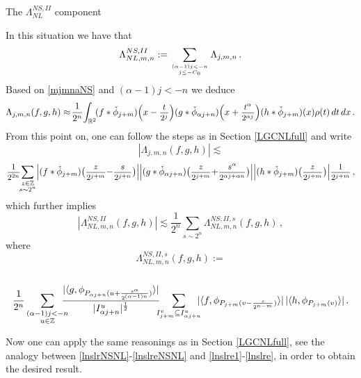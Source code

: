 \documentclass[a4paper,reqno]{amsart}
\makeatletter
\def\subsubsection{\@startsection{subsubsection}{3}%
	\z@{.5\linespacing\@plus.7\linespacing}{-.5em}%
	{\normalfont\bfseries\boldmath}}
\numberwithin{equation}{section}
\theoremstyle{definition}
\newcommand{\R}{\mathbb{R}}
\newcommand{\Z}{\mathbb{Z}}
\newcommand{\s}{\mathcal{S}}
\newcommand{\sdfrac}[2]{\mbox{\small$\displaystyle\frac{#1}{#2}$}}
\def\a{\alpha}
\def\L{\Lambda}
\makeatother
\begin{document}
\subsubsection{The $\L^{NS,II}_{NL}$ component}


In this situation we have that
\begin{align}\label{ns10NSNL}
\L^{NS,II}_{NL,m,n}:=\sum_{{(\a-1)j<-n}\atop{j\leq -C_0}} \L_{j,m,n}\,.
\end{align}
Based on \eqref{mjmnaNS} and $(\a-1)j<-n$ we deduce
\begin{equation}\label{saljm2nlNSNL}
\L_{j,m,n}(f,g,h)\approx\!\frac{1}{2^n}\!\int_{\R^2}\!  (f*\check{\phi}_{j+m})\Big(x-\sdfrac{t}{2^j}\Big)(g*\check{\phi}_{\a j+n})\Big(x+\sdfrac{t^{\a}}{2^{\a j}}\Big)(h*\check{\phi}_{j+m})(x)\rho(t)\,dt\,dx\,.
\end{equation}
From this point on, one can follow the steps as in Section \ref{LGCNLfull} and write
\begin{equation}\label{saljm20NSNL}
	|\L_{j,m,n}(f,g,h)|\lesssim
\end{equation}
$$\sdfrac{1}{2^{2n}}\!\!\sum_{\substack{z\in\Z\\s\sim 2^n}}\! \Big|(f*\check{\phi}_{j+m})\big(\sdfrac{z}{2^{j+m}}{-}\sdfrac{s}{2^{j+n}}\big)\Big|
\Big|(g*\check{\phi}_{\a j+n}) \big(\sdfrac{z}{2^{j+m}}{+}\sdfrac{s^{\a}}{2^{\a j+\a n}}\big)\Big|
\Big|(h*\check{\phi}_{j+m})\big(\sdfrac{z}{2^{j+m}}\big)\Big| \sdfrac{1}{2^{j+m}}\,,$$
which further implies
\begin{equation}\label{lnslrNSNL}
|\L^{NS,II}_{NL,m,n}(f,g,h)|\lesssim \frac{1}{2^n}\sum_{s\sim 2^n} \L^{NS,II,s}_{NL,m,n}(f,g,h)\,,
\end{equation}
where
\begin{equation}\label{lnslreNSNL}
	\L^{NS,II,s}_{NL,m,n}(f,g,h):=
\end{equation}
\\[-4.5ex]
$$\frac{1}{2^n}\sum_{\substack{(\a-1)j<-n\\ u\in\Z}}\hspace{-.3cm}
\frac{|\langle g,  \phi_{P_{\a j+n}(u+\frac{s^{\a}}{2^{(\a-1) n}})}\rangle|}{|I_{\a j+n}^u|^{\frac{1}{2}}} \hspace{-.2cm}\sum_{I_{j+m}^v\subseteq I_{\a j+ n}^u}\hspace{-.2cm}
|\langle f,  \phi_{P_{j+m}(v-\frac{s}{2^{n-m}})}\rangle|\,|\langle h,  \phi_{P_{j+m}(v)}\rangle|\,.$$

Now one can apply the same reasonings as in Section \ref{LGCNLfull}, see the analogy between \eqref{lnslrNSNL}-\eqref{lnslreNSNL} and \eqref{lnslre1}-\eqref{lnslre}, in order to obtain the desired result.
\end{document}
